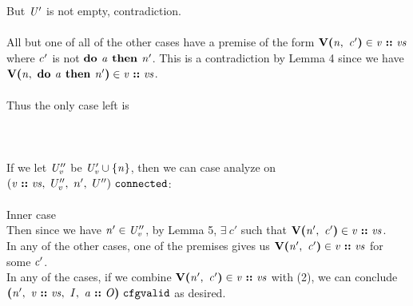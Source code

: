 \documentclass[12pt]{article}
\begin{document}
But $\mathit{U'}$ is not empty, contradiction.\\
\\

All but one of all of the other cases have a premise of the form
$\textbf{V(}\mathit{n},\ \mathit{c'}\textbf{)} \in \mathit{v}\ \textbf{::}\ \mathit{vs}$ where
$\mathit{c'}$ is not $\textbf{do }\mathit{a}\textbf{ then }\mathit{n'}$. This is a contradiction by
Lemma 4 since we have $\textbf{V(}\mathit{n},\ \textbf{do }\mathit{a}\textbf{ then }\mathit{n'}\textbf{)} \in
\mathit{v}\ \textbf{::}\ \mathit{vs}$.\\
\\

Thus the only case left is\\
\\
\\
\\

If we let $\mathit{U_v''}$ be $\mathit{U_v' \cup \{n\}}$, then we can
case analyze on $(\mathit{v}\ \textbf{::}\ \mathit{vs},\ U_v'',\ n',\ U'')\ \mathtt{connected}$:\\
\\

Inner case
\\

Then since we have $\mathit{n'} \in \mathit{U_v''}$, by Lemma 5, $\exists\ c'$
such that $\textbf{V(}\mathit{n'},\ \mathit{c'}\textbf{)} \in \mathit{v}\ \textbf{::}\ \mathit{vs}$.\\

In any of the other cases, one of the premises gives us
$\textbf{V(}\mathit{n'},\ \mathit{c'}\textbf{)} \in \mathit{v}\ \textbf{::}\ \mathit{vs}$ for some
$\mathit{c'}$.
\\

In any of the cases, if we combine $\textbf{V(}\mathit{n'},\ \mathit{c'}\textbf{)} \in
\mathit{v}\ \textbf{::}\ \mathit{vs}$ with (2), we can conclude
$\textbf{(}\mathit{n'},\ \mathit{v}\ \textbf{::}\ \mathit{vs},\ \mathit{I},\ \mathit{a}\ \textbf{::}\ \mathit{O}\textbf{)}\ \mathtt{cfgvalid}$
as desired.\\
\\
\end{document}
